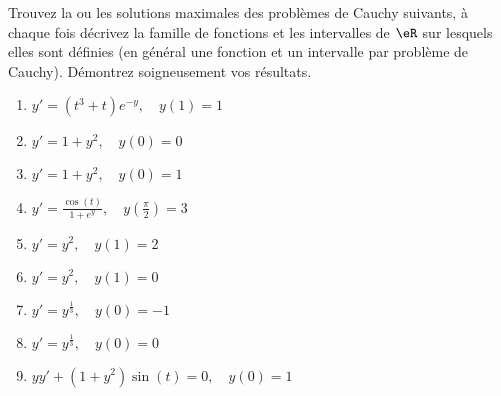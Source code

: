 
\begin{exercice}\label{exoEqsDiff0003}

Trouvez la ou les solutions maximales des problèmes de Cauchy suivants, à chaque fois décrivez la famille de fonctions et les intervalles de $\eR$ sur lesquels elles sont définies (en général une fonction et un intervalle par problème de Cauchy). Démontrez soigneusement vos résultats.
\begin{multicols}{2}
\begin{enumerate}
\item $ y' = (t^3 + t) e^{-y}, \quad y(1)=1$
\item $ y' = 1 + y^2, \quad y(0) = 0$
\item $ y' = 1 + y^2, \quad y(0) = 1$
\item $ y' = \frac{\cos(t)}{1 + e^y}, \quad y(\frac{\pi}{2})=3 $
\item $ y' = y^2, \quad y(1) = 2$
\item $ y' = y^2, \quad y(1) = 0$
\item $ y' = y^{\frac{1}{3}}, \quad y(0) = -1 $
\item $ y' = y^{\frac{1}{3}},\quad y(0) = 0 $
\item $ yy' + (1 + y^2) \sin(t) = 0,\quad y(0) = 1 $
\end{enumerate}	
\end{multicols}

\end{exercice}
